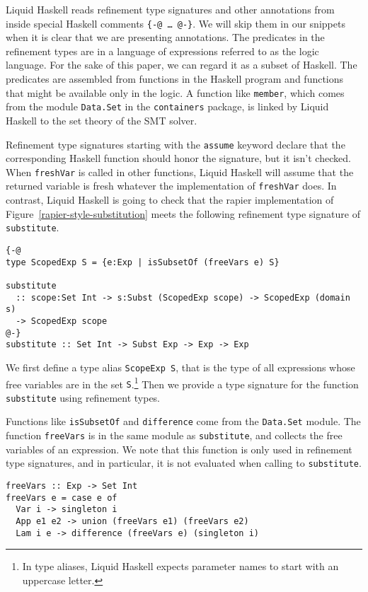 \documentclass[acmtog, anonymous]{acmart}
\newcommand{\tc}[1]{{\small\texttt{#1}}}
\begin{document}
Liquid Haskell reads refinement type signatures and other annotations from
inside special Haskell comments
\tc{\{-@ \ldots\ @-\}}. We will skip them in our snippets when it is clear
that we are presenting annotations.
The predicates in the refinement types are in a language of expressions
referred to as the logic language. For the sake of this paper, we can
regard it as a subset of Haskell. The predicates are assembled from
functions in the Haskell program and functions that might be available
only in the logic.
A function like \tc{member}, which comes from the module \tc{Data.Set}
in the \tc{containers} package, is linked by Liquid Haskell to the set
theory of the SMT solver.

Refinement type signatures starting with the \tc{assume} keyword declare that the
corresponding Haskell function should honor the signature, but it isn't
checked. When \tc{freshVar} is called in other functions, Liquid Haskell
will assume that the returned variable is fresh whatever the implementation
of \tc{freshVar} does. In contrast, Liquid Haskell is going to check that
the rapier implementation of Figure~\ref{rapier-style-substitution} meets the
following refinement type signature of \tc{substitute}.

\begin{verbatim}
{-@
type ScopedExp S = {e:Exp | isSubsetOf (freeVars e) S}

substitute
  :: scope:Set Int -> s:Subst (ScopedExp scope) -> ScopedExp (domain s)
  -> ScopedExp scope
@-}
substitute :: Set Int -> Subst Exp -> Exp -> Exp
\end{verbatim}

We first define a type alias \tc{ScopeExp S}, that is the type of all
expressions whose free variables are in the set \tc{S}.\footnote{In type aliases,
Liquid Haskell expects parameter names to start with an uppercase letter.}
Then we provide a type signature for the function \tc{substitute} using
refinement types.

Functions like \tc{isSubsetOf} and \tc{difference} come from the \tc{Data.\allowbreak Set}
module. The function \tc{freeVars} is in the same module as \tc{subs\-ti\-tute},
and collects the free variables of an expression. We note that this function
is only used in refinement type signatures, and in particular, it is not evaluated
when calling to \tc{substitute}.

\begin{verbatim}
freeVars :: Exp -> Set Int
freeVars e = case e of
  Var i -> singleton i
  App e1 e2 -> union (freeVars e1) (freeVars e2)
  Lam i e -> difference (freeVars e) (singleton i)
\end{verbatim}
\end{document}
